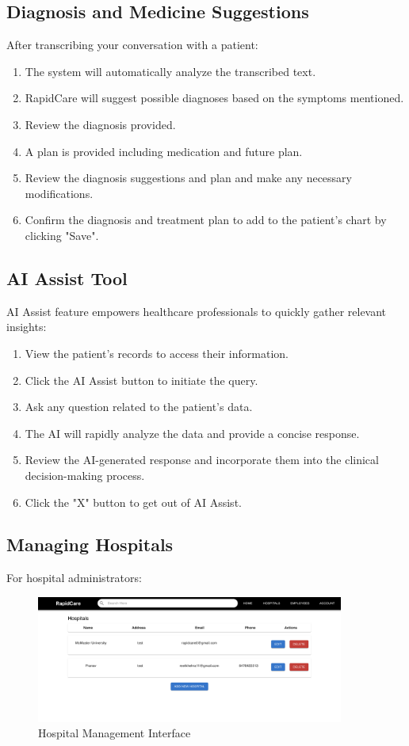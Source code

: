 \documentclass[12pt, titlepage]{article}
\begin{document}
\subsection{Diagnosis and Medicine Suggestions}
After transcribing your conversation with a patient:

\begin{enumerate}
\item The system will automatically analyze the transcribed text.
\item RapidCare will suggest possible diagnoses based on the symptoms mentioned.
\item Review the diagnosis provided.
\item A plan is provided including medication and future plan.
\item Review the diagnosis suggestions and plan and make any necessary modifications.
\item Confirm the diagnosis and treatment plan to add to the patient's chart by clicking "Save".
\end{enumerate}

\subsection{AI Assist Tool}

AI Assist feature empowers healthcare professionals to quickly gather relevant insights:

\begin{enumerate} 
\item View the patient's records to access their information. 
\item Click the AI Assist button to initiate the query. 
\item Ask any question related to the patient's data.
\item The AI will rapidly analyze the data and provide a concise response. 
\item Review the AI-generated response and incorporate them into the clinical decision-making process. 
\item Click the "X" button to get out of AI Assist.
\end{enumerate}

\subsection{Managing Hospitals}
For hospital administrators:

\begin{figure}[H]
\centering
\includegraphics[width=0.9\textwidth]{hospital.png}
\caption{Hospital Management Interface}
\label{fig:Hospital Management Interface}
\end{figure}
\end{document}
